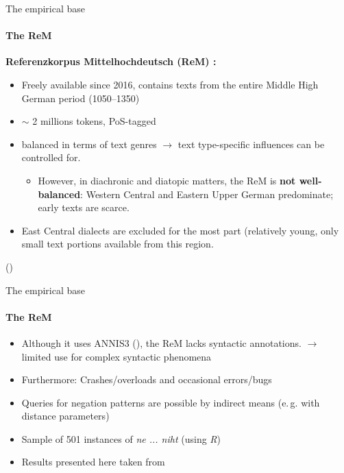 \documentclass[xcolor=table, compress, %
handout
]{beamer}
\begin{document}
\begin{frame}{The empirical base}
\framesubtitle{The ReM}

\textbf{Referenzkorpus Mittelhochdeutsch (ReM) :}
    \begin{itemize}
        \item Freely available since 2016, contains texts from the entire Middle High German period (1050–1350) 
        \item $\sim$ 2 millions tokens, PoS-tagged
        \item \alert{balanced} in terms of text genres $\rightarrow$ text type-specific influences can be controlled for.
 \begin{itemize}       
         \item However, in \alert{diachronic and diatopic matters}, the ReM is \textbf{not well-balanced}: Western Central and Eastern Upper German predominate; early texts are scarce.
\end{itemize}
\end{itemize}

{\small
\begin{itemize}
\item[\Pointinghand] East Central dialects are excluded for the most part (relatively young, only small text portions available from this region.
\end{itemize}
}

{\tiny (\citealt{kleinetal16})}

\end{frame}

\begin{frame}{The empirical base}
\framesubtitle{The ReM}

    \begin{itemize}
        \item Although it uses ANNIS3 (\citealt{Krause2016}), the ReM  \alert{lacks syntactic annotations}. $\rightarrow$ limited use for complex syntactic phenomena
        \item Furthermore: Crashes/overloads and occasional errors/bugs 
        \item Queries for negation patterns are possible by indirect means (e.\,g. with distance parameters)
        \item Sample of 501 instances of \textit{ne ... niht} (using \textit{R})
        \item Results presented here taken from \citet{hrbek21}
    \end{itemize}

\end{frame}
\end{document}
